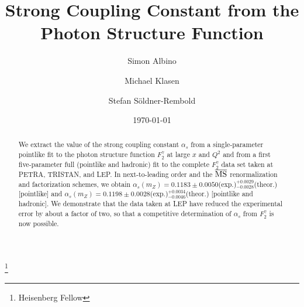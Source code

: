 \documentclass[aps,prl,twocolumn,groupedaddress]{revtex4}
\begin{document}
\def\eps{\varepsilon}
\def\ms{\overline{\rm MS}}
\def\lms{\Lambda_{\ms}}
\def\disg{{\rm DIS}_\gamma}

\def\f2y{F_2^\gamma}
\def\fqy{f_{q/\gamma}}
\def\fby{f_{\bar{q}/\gamma}}
\def\fgy{f_{g/\gamma}}
\def\d  {{\rm d}}
\def\O  {{\cal O}}

\def\lp{\left. }
\def\rp{\right. }
\def\lr{\left( }
\def\rr{\right) }
\def\le{\left[ }
\def\re{\right] }
\def\lg{\left\{ }
\def\rg{\right\} }
\def\lb{\left| }
\def\rb{\right| }

\def\beq{\begin{equation}}
\def\eeq{\end{equation}}
\def\bea{\begin{eqnarray}}
\def\eea{\end{eqnarray}}

\title{Strong Coupling Constant from the Photon Structure Function}
\author{Simon Albino}
\author{Michael Klasen}
\author{Stefan S\"oldner-Rembold}
\thanks{Heisenberg Fellow}
\date{\today}
\begin{abstract}
We extract the value of the strong coupling constant $\alpha_s$ from a
single-parameter pointlike fit to the photon structure function $\f2y$ at large
$x$ and $Q^2$ and from a first five-parameter full (pointlike and hadronic) fit
to the complete $\f2y$ data set taken at PETRA, TRISTAN, and LEP. In
next-to-leading order and the $\ms$ renormalization and factorization schemes,
we obtain
	$\alpha_s(m_Z)=0.1183\pm0.0050$(exp.)$^{+0.0029}_{-0.0028}$(theor.)
	[pointlike]
and 
	$\alpha_s(m_Z)=0.1198\pm0.0028$(exp.)$^{+0.0034}_{-0.0046}$(theor.)
	[pointlike and hadronic].
We demonstrate that the data taken at LEP have reduced the experimental error
by about a factor of two, so that a competitive determination of $\alpha_s$
from $\f2y$ is now possible.
\end{abstract}
\maketitle
\end{document}
